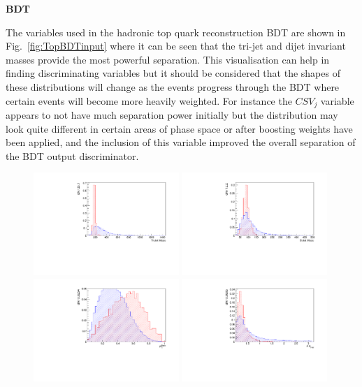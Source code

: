 \textbf{BDT}

The variables used in the hadronic top quark reconstruction BDT are shown in Fig.~\ref{fig:TopBDTinput} where it can be seen that the tri-jet and dijet invariant masses provide the most powerful separation. This visualisation can help in finding discriminating variables but it should be considered that the shapes of these distributions will change as the events progress through the BDT where certain events will become more heavily weighted. For instance the $CSV_{j}$ variable appears to not have much separation power initially but the distribution may look quite different in certain areas of phase space or after boosting weights have been applied, and the inclusion of this variable improved the overall separation of the BDT output discriminator.

\begin{figure}[ht!]
\centering
    \includegraphics[width=0.49\textwidth]{images/Run1/TriJetMass.pdf}
     \includegraphics[width=0.49\textwidth]{images/Run1/HadWMass.pdf}
    \includegraphics[width=0.49\textwidth]{images/Run1/ThSumPTVecPT.pdf}
     \includegraphics[width=0.49\textwidth]{images/Run1/AnThWh.pdf}

\end{figure}
